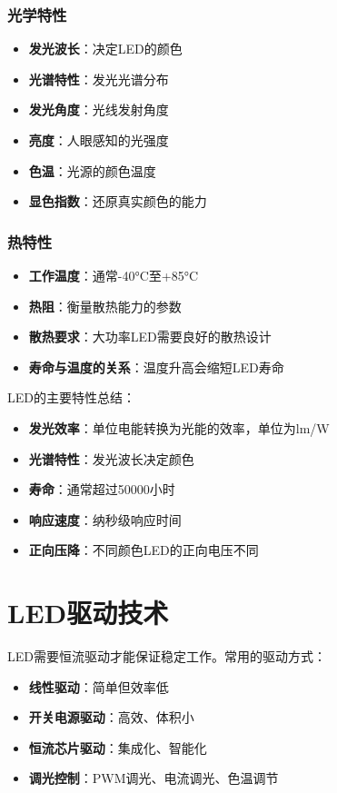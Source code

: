 \subsubsection{光学特性}
\begin{itemize}
    \item \textbf{发光波长}：决定LED的颜色
    \item \textbf{光谱特性}：发光光谱分布
    \item \textbf{发光角度}：光线发射角度
    \item \textbf{亮度}：人眼感知的光强度
    \item \textbf{色温}：光源的颜色温度
    \item \textbf{显色指数}：还原真实颜色的能力
\end{itemize}

\subsubsection{热特性}
\begin{itemize}
    \item \textbf{工作温度}：通常-40°C至+85°C
    \item \textbf{热阻}：衡量散热能力的参数
    \item \textbf{散热要求}：大功率LED需要良好的散热设计
    \item \textbf{寿命与温度的关系}：温度升高会缩短LED寿命
\end{itemize}

LED的主要特性总结：
\begin{itemize}
    \item \textbf{发光效率}：单位电能转换为光能的效率，单位为lm/W
    \item \textbf{光谱特性}：发光波长决定颜色
    \item \textbf{寿命}：通常超过50000小时
    \item \textbf{响应速度}：纳秒级响应时间
    \item \textbf{正向压降}：不同颜色LED的正向电压不同
\end{itemize}

\section{LED驱动技术}
\label{sec:led_driving}

LED需要恒流驱动才能保证稳定工作。常用的驱动方式：

\begin{itemize}
    \item \textbf{线性驱动}：简单但效率低
    \item \textbf{开关电源驱动}：高效、体积小
    \item \textbf{恒流芯片驱动}：集成化、智能化
    \item \textbf{调光控制}：PWM调光、电流调光、色温调节
\end{itemize}

